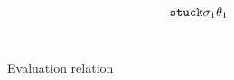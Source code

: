 \begin{figure*}
\begin{gather*}
{        {\ensuremath{\mathtt{stuck}}}{\ensuremath{\sigma}_1}{\ensuremath{\theta}_1}}
\end{gather*}
\\ %
\caption{Evaluation relation}
\label{fig:operational}
\end{figure*}
